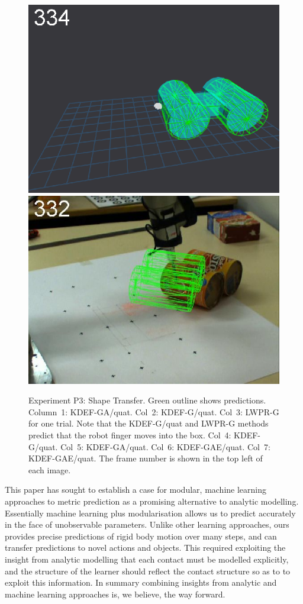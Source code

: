 \begin{figure}[tbp]
{\includegraphics[width=\imgCXwid]{images/C5_3exp_6_5}
\includegraphics[width=\imgCXwid]{images/C2_3exp_75_5}
}

\caption {Experiment P3: Shape Transfer. Green outline shows predictions. Column~1: KDEF-GA/quat.
  Col~2: KDEF-G/quat. Col~3: LWPR-G for one trial.  Note that the
  KDEF-G/quat and LWPR-G methods predict that the robot finger moves
  into the box.  Col~4: KDEF-G/quat. Col~5: KDEF-GA/quat. Col~6:
  KDEF-GAE/quat. Col~7: KDEF-GAE/quat. The frame number is shown in
  the top left of each image.  }
\label{fig:ExperimentStransfer}
\end{figure}

This paper has sought to establish a case for modular, machine learning approaches to metric prediction as a promising alternative to analytic modelling. Essentially machine learning plus modularisation allows us to predict accurately in the face of unobservable parameters. Unlike other learning approaches, ours provides precise predictions of rigid body motion over many steps, and can transfer predictions to novel actions and objects. This required exploiting the insight from analytic modelling that each contact must be modelled explicitly, and the structure of the learner should reflect the contact structure so as to to exploit this information. In summary combining insights from analytic and machine learning approaches is, we believe, the way forward.
